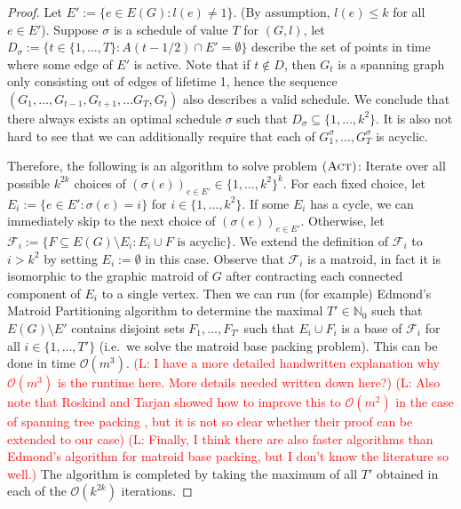 \documentclass[10pt,a4paper]{article}
\numberwithin{equation}{section}
\newcommand{\N}{\mathbb{N}}
\newcommand{\set}[1]{\{ #1 \}}
\newcommand{\fromto}[2]{\set{#1, \ldots, #2}}
\newcommand{\comment}[1]{\textcolor{red}{(L: #1)}}
\newcommand{\bigO}{\mathcal{O}}
\newcommand{\act}{\textsc{(Act)}}
\begin{document}
\begin{proof}
Let $E' := \set{e \in E(G) : l(e) \neq 1}$. (By assumption, $l(e) \leq k$ for all $e \in E'$). Suppose $\sigma$ is a schedule of value $T$ for $(G, l)$, let $D_\sigma := \set{t \in \fromto{1}{T} : A(t - 1/2) \cap E' = \emptyset}$ describe the set of points in time where some edge of $E'$ is active. Note that  if $t \not\in D$, then $G_t$ is a spanning graph only consisting out of edges of lifetime 1, hence the sequence $(G_1, \dots, G_{t-1}, G_{t+1}, \dots G_T, G_t)$ also describes a valid schedule. We conclude that there always exists an optimal schedule $\sigma$ such that $D_\sigma \subseteq \fromto{1}{k^2}$. It is also not  hard to see that we can additionally require that each of $G_1^\sigma, \dots, G_T^\sigma$ is acyclic.

Therefore, the following is an algorithm to solve problem $\act$: Iterate over all possible $k^{2k}$ choices of $(\sigma(e))_{e \in E'} \in \fromto{1}{k^2}^k$. For each fixed choice, let $E_i := \set{e \in E' : \sigma(e) = i}$ for $i \in \fromto{1}{k^2}$. If some $E_i$ has a cycle, we can immediately skip to the next choice of $(\sigma(e))_{e \in E'}$. Otherwise, let $\mathcal{F}_i := \set{F \subseteq E(G) \setminus E_i : E_i \cup F \text{ is acyclic}}$. We extend the definition of $\mathcal{F}_i$ to $i > k^2$ by setting $E_i := \emptyset$ in this case. Observe that $\mathcal{F}_i$ is a matroid, in fact it is isomorphic to the graphic matroid of $G$ after contracting each connected component of $E_i$ to a single vertex. Then we can run (for example)
 Edmond's Matroid Partitioning algorithm to determine the maximal $T' \in \N_0$ such that $E(G) \setminus E'$ contains disjoint sets $F_1, \dots, F_{T'}$ such that $E_i \cup F_i$ is a base of $\mathcal{F}_i$ for all $i \in \fromto{1}{T'}$ (i.e.\ we solve the matroid base packing problem). This can be done in time $\bigO(
m^3)$. \comment{I have a more detailed handwritten explanation why $\bigO(m^3)$ is the runtime here. More details needed written down here?} \comment{Also note that Roskind and Tarjan showed how to improve this to $\bigO(m^2)$ in the case of spanning tree packing \cite{STPMatroidImprovement}, but it is not so clear whether their proof can be extended to our case} \comment{Finally, I think there are also faster algorithms than Edmond's algorithm for matroid base packing, but I don't know the literature so well.} The algorithm is completed by taking the maximum of all $T'$ obtained in each of the $\bigO(k^{2k})$ iterations.
\end{proof}
\end{document}
